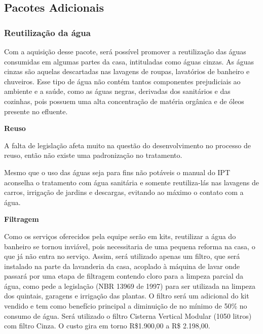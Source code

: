 \subsection{Pacotes Adicionais}

\subsubsection{Reutilização da água}
\par Com a aquisição desse pacote, será possível promover a reutilização das águas consumidas em algumas partes da casa, intituladas como águas cinzas. As águas cinzas são aquelas descartadas nas lavagens de roupas, lavatórios de banheiro e chuveiros. Esse tipo de água não contém tantos componentes prejudiciais ao ambiente e a saúde, como as águas negras, derivadas dos sanitários e das cozinhas, pois possuem uma alta concentração de matéria orgânica e de óleos presente no efluente.

\textbf{Reuso}
\par A falta de legislação afeta muito na questão do desenvolvimento no processo de reuso, então não existe uma padronização no tratamento.
\par Mesmo que o uso das águas seja para fins não potáveis o manual do IPT aconselha o tratamento com água sanitária e somente reutiliza-lás nas lavagens de carros, irrigação de jardins e descargas, evitando ao máximo o contato com a água.

\textbf{Filtragem}
\par Como os serviços oferecidos pela equipe serão em kits, reutilizar a água do banheiro se tornou inviável, pois necessitaria de uma pequena reforma na casa, o que já não entra no serviço. Assim, será utilizado apenas um filtro, que será instalado na parte da lavanderia da casa, acoplado à máquina de lavar onde passará por uma etapa de filtragem contendo cloro para a limpeza parcial da água, como pede a legislação (NBR 13969 de 1997) para ser utilizada na limpeza dos quintais, garagens e irrigação das plantas. O filtro será um adicional do kit vendido e tem como benefício principal a diminuição de no mínimo de 50\% no consumo de água. Será utilizado o filtro Cisterna Vertical Modular (1050 litros) com filtro Cinza.  O custo gira em torno R\$1.900,00 a R\$ 2.198,00.

